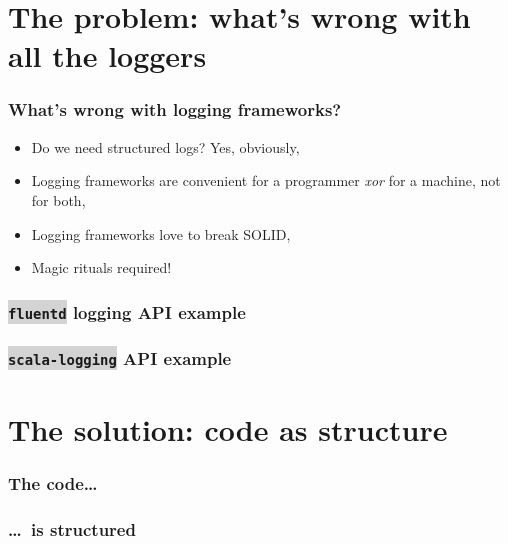 \documentclass[usenames,dvipsnames]{beamer}
\newcommand{\code}[1]{\colorbox{lightgray}{\texttt{#1}}}
\begin{document}
\begin{frame}
\titlepage
\end{frame}

\section{The problem: what's wrong with all the loggers}

\begin{frame}
\frametitle{What's wrong with logging frameworks?}

\begin{itemize}
\item Do we need structured logs? Yes, obviously,
\item Logging frameworks are convenient for a programmer \textit{xor} for a machine, not for both,
\item Logging frameworks love to break SOLID,
\item Magic rituals required!
\end{itemize}
\end{frame}

\begin{frame}
\frametitle{\code{fluentd} logging API example}
\end{frame}

\begin{frame}
\frametitle{\code{scala-logging} API example}
\end{frame}

\section{The solution: code as structure}
\begin{frame}
\frametitle{The code\dots}
\end{frame}

\begin{frame}
\frametitle{\dots~is structured}
\end{frame}
\end{document}
